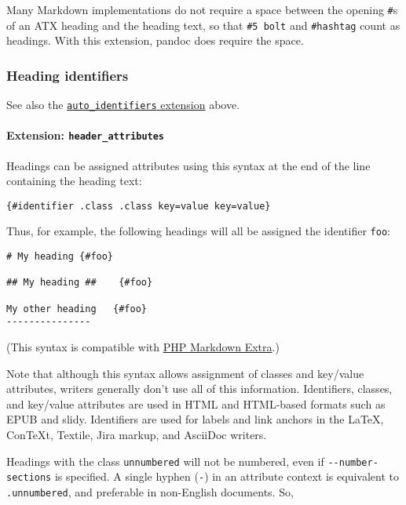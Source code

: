 \documentclass[]{article}
\begin{document}
Many Markdown implementations do not require a space between the opening
\texttt{\#}s of an ATX heading and the heading text, so that
\texttt{\#5\ bolt} and \texttt{\#hashtag} count as headings. With this
extension, pandoc does require the space.

\hypertarget{heading-identifiers}{%
\subsubsection{Heading identifiers}\label{heading-identifiers}}

See also the
\protect\hyperlink{extension-auto_identifiers}{\texttt{auto\_identifiers}
extension} above.

\hypertarget{extension-header_attributes}{%
\paragraph{\texorpdfstring{Extension:
\texttt{header\_attributes}}{Extension: header\_attributes}}\label{extension-header_attributes}}

Headings can be assigned attributes using this syntax at the end of the
line containing the heading text:

\begin{verbatim}
{#identifier .class .class key=value key=value}
\end{verbatim}

Thus, for example, the following headings will all be assigned the
identifier \texttt{foo}:

\begin{verbatim}
# My heading {#foo}

## My heading ##    {#foo}

My other heading   {#foo}
---------------
\end{verbatim}

(This syntax is compatible with
\href{https://michelf.ca/projects/php-markdown/extra/}{PHP Markdown
Extra}.)

Note that although this syntax allows assignment of classes and
key/value attributes, writers generally don't use all of this
information. Identifiers, classes, and key/value attributes are used in
HTML and HTML-based formats such as EPUB and slidy. Identifiers are used
for labels and link anchors in the LaTeX, ConTeXt, Textile, Jira markup,
and AsciiDoc writers.

Headings with the class \texttt{unnumbered} will not be numbered, even
if \texttt{-\/-number-sections} is specified. A single hyphen
(\texttt{-}) in an attribute context is equivalent to
\texttt{.unnumbered}, and preferable in non-English documents. So,
\end{document}
